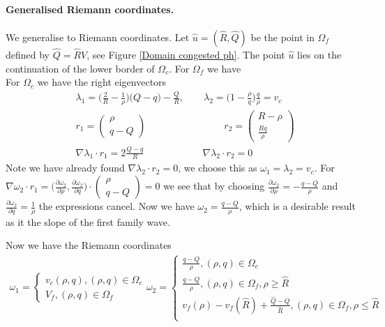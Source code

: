 
\paragraph{Generalised Riemann coordinates.}
We generalise to Riemann coordinates. Let $\hat u = (\hat R, \hat Q)$ be the point in $\Omega_f$ defined by $\hat Q = \hat R V$, see Figure \ref{Domain congested ph}. The point $\hat u$ lies on the continuation of the lower border of $\Omega_c$.  
For $\Omega_f$ we have \\
For $\Omega_c$ we have the right eigenvectors
\begin{align*}
    &\lambda_1 = \big ( \frac{2}{R} - \frac{1}{\rho} )\big (Q- q) - \frac{Q}{R}, \quad \quad \lambda_2 = \big(1 - \frac{\rho}{q}\big)\frac{q}{\rho} = v_c \\
    & r_1 = \begin{pmatrix} \rho \\ q - Q \end{pmatrix} \quad \quad \quad  \quad \quad \quad \quad \quad  r_2 = \begin{pmatrix} R - \rho \\ \frac{Rq}{\rho} \end{pmatrix} \\
    & \nabla \lambda_1 \cdot r_1 = 2\frac{Q-q}{R} \quad \quad \quad \quad \quad  \quad \nabla \lambda_2 \cdot r_2 = 0
\end{align*}
Note we have already found $\nabla \lambda_2 \cdot r_2 = 0$, we choose this as $\omega_1 = \lambda_2 = v_c$. For $\nabla \omega_2 \cdot r_1 = \big ( \frac{\partial \omega_2}{\partial \rho}, \frac{\partial \omega_2}{\partial q} \big ) \cdot \begin{pmatrix} \rho \\ q - Q \end{pmatrix} = 0 $ we see that by choosing  $\frac{\partial \omega_2}{\partial \rho} = - \frac{ q-Q }{\rho}$ and $ \frac{\partial \omega_2}{\partial q} =  \frac{1}{\rho} $ the expressions cancel. Now we have    $\omega_2 = \frac{q-Q}{\rho}$, which is a desirable result as it the slope of the first family wave. 

Now we have the Riemann coordinates
\begin{align*}
    \omega_1 = \begin{cases}
    v_c(\rho, q), (\rho, q) \in \Omega_c \\
    V_f, (\rho, q) \in \Omega_f
    \end{cases}
    \omega_2 = \begin{cases}
    \frac{q-Q}{\rho}, (\rho, q) \in \Omega_c \\
    \frac{q-Q}{\rho}, (\rho, q) \in \Omega_f, \rho \geq \hat R \\
    v_f(\rho) - v_f(\hat R) + \frac{\hat Q - Q}{\hat R }, (\rho, q) \in \Omega_f, \rho \leq \hat R \\
    \end{cases}
\end{align*}

